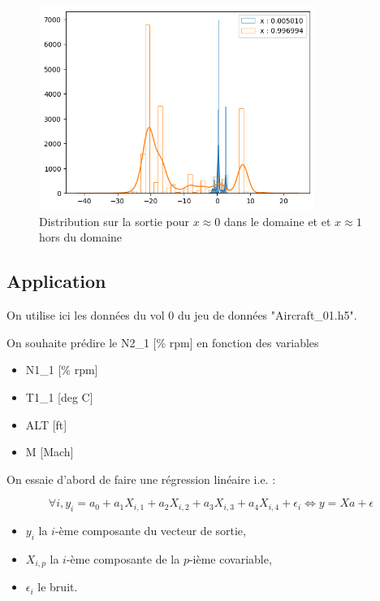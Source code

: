 \documentclass[french,12pt]{article}
\let\oldsubsection\subsection%
\renewcommand{\subsection}{%
  \renewcommand{\theequation}{\thesubsection.\arabic{equation}}%
  \oldsubsection}%
\begin{document}
\begin{figure}[H]
    \centering
    \includegraphics[width = 0.8\textwidth]{../plots/outputUQSin.png}
    \caption{Distribution sur la sortie pour $x \approx 0$ dans le domaine et et $x \approx 1$ hors du domaine}
\end{figure}

\subsection{Application}

On utilise ici les données du vol 0 du jeu de données "Aircraft\_01.h5".

On souhaite prédire le N2\_1 [\% rpm] en fonction des variables

\begin{itemize}
    \item N1\_1 [\% rpm]
    \item T1\_1 [deg C]
    \item ALT [ft]
    \item M [Mach]
\end{itemize}

On essaie d'abord de faire une régression linéaire i.e. :

\begin{equation}
    \forall i, y_i = a_0 + a_1 X_{i, 1}+ a_2 X_{i, 2}+ a_3 X_{i, 3}+ a_4 X_{i, 4} + \epsilon_i \Leftrightarrow y = X a + \epsilon  
\end{equation}

\begin{itemize}
    \item $y_i$ la $i$-ème composante du vecteur de sortie,
    \item $X_{i,p}$ la $i$-ème composante de la $p$-ième covariable,
    \item $\epsilon_i$ le bruit.
\end{itemize}
\end{document}
